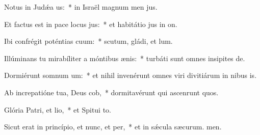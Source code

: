 \item Notus in Judǽa us:~* in Israël magnum men jus.
\item Et factus est in pace locus jus:~* et habitátio jus in on.
\item Ibi confrégit poténtias cuum:~* scutum, gládi, et lum.
\item Illúminans tu mirabíliter a móntibus ænis:~* turbáti sunt omnes insipites de.
\item Dormiérunt somnum um:~* et nihil invenérunt omnes viri divitiárum in nibus is.
\item Ab increpatióne tua, Deus cob,~* dormitavérunt qui ascenrunt quos.
\item Glória Patri, et lio,~* et Spitui to.
\item Sicut erat in princípio, et nunc, et per,~* et in sǽcula sæcurum. men.
